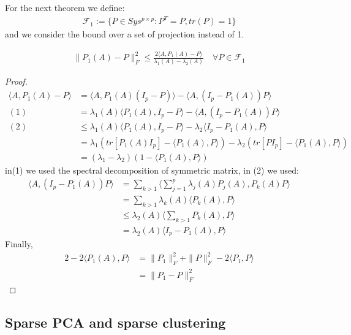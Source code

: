 For the next theorem we define:
\begin{align*}
	\mathcal{F}_1:= \{P \in Sys^{p \times p}: P^T = P, tr(P) = 1\}
\end{align*}
and we consider the bound over a set of projection instead of 1.
\begin{theorem}[Davis-Kahn for $j = 1$]
\begin{align*}
	\|P_1(A) - P\|_F^2 \le \frac{2\langle A, P_1(A) - P \rangle}{\lambda_1(A) - \lambda_2(A)}
	\quad \forall P \in \mathcal{F}_1
\end{align*}
\end{theorem}
\begin{proof}
	\begin{align*}
		\langle A, P_1(A) - P\rangle &= \langle A, P_1(A)(I_p - P) \rangle - \langle A, (I_p - P_1(A))P \rangle\\
	(1)	&= \lambda_1(A)\langle P_1(A), I_p- P\rangle - \langle A, (I_p - P_1(A))P \rangle \\
	(2)	&\le \lambda_1(A)\langle P_1(A), I_p- P\rangle - \lambda_2\langle I_p - P_1(A), P\rangle\\
	&= \lambda_1 (tr[P_1(A)I_p] - \langle P_1(A), P\rangle) - \lambda_2(tr[PI_p]- \langle P_1(A), P\rangle)\\
	&= (\lambda_1 - \lambda_2 )(1- \langle P_1(A) , P\rangle)
	\end{align*}
	in(1) we used the spectral decomposition of symmetric matrix,  in (2) we used:
	\begin{align*}
		\langle A, (I_p - P_1(A))P \rangle &= \sum_{k >1}\langle \sum_{j = 1}^p \lambda_j(A)P_j(A), P_k(A) P\rangle\\ 
		&= \sum_{k >1}\lambda_k(A)\langle P_k(A), P\rangle\\
		&\le \lambda_2(A) \langle\sum_{k >1}P_k(A), P\rangle\\
		&= \lambda_2(A)\langle I_p - P_1(A), P\rangle
	\end{align*}
	Finally, 
	\begin{align*}
		2 - 2\langle P_1(A), P\rangle &= \|P_1\|_F^2 + \|P\|_F^2 - 2\langle P_1, P \rangle\\
		&= \|P_1 - P\|_F^2
	\end{align*}
\end{proof}




\subsection{Sparse PCA and sparse clustering}
